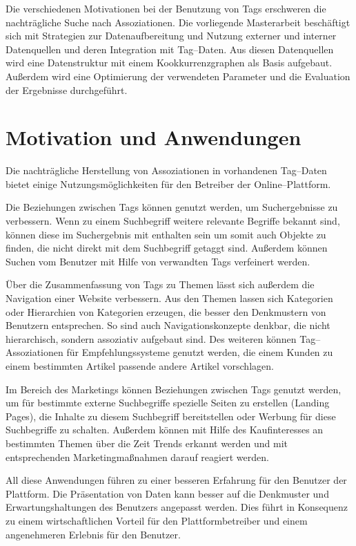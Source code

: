Die verschiedenen Motivationen bei der Benutzung von Tags erschweren die nachträgliche Suche nach Assoziationen. Die vorliegende Masterarbeit beschäftigt sich mit Strategien zur Datenaufbereitung und Nutzung externer und interner Datenquellen und deren Integration mit Tag--Daten. Aus diesen Datenquellen wird eine Datenstruktur mit einem Kookkurrenzgraphen als Basis aufgebaut. Außerdem wird eine Optimierung der verwendeten Parameter und die Evaluation der Ergebnisse durchgeführt.

\section{Motivation und Anwendungen}

Die nachträgliche Herstellung von Assoziationen in vorhandenen Tag--Daten bietet einige Nutzungsmöglichkeiten für den Betreiber der Online--Plattform.

Die Beziehungen zwischen Tags können genutzt werden, um Suchergebnisse zu verbessern. Wenn zu einem Suchbegriff weitere relevante Begriffe bekannt sind, können diese im Suchergebnis mit enthalten sein um somit auch Objekte zu finden, die nicht direkt mit dem Suchbegriff getaggt sind. Außerdem können Suchen vom Benutzer mit Hilfe von verwandten Tags verfeinert werden.

Über die Zusammenfassung von Tags zu Themen lässt sich außerdem die Navigation einer Website verbessern. Aus den Themen lassen sich Kategorien oder Hierarchien von Kategorien erzeugen, die besser den Denkmustern von Benutzern entsprechen. So sind auch Navigationskonzepte denkbar, die nicht hierarchisch, sondern assoziativ aufgebaut sind. Des weiteren können Tag--Assoziationen für Empfehlungssysteme genutzt werden, die einem Kunden zu einem bestimmten Artikel passende andere Artikel vorschlagen.

Im Bereich des Marketings können Beziehungen zwischen Tags genutzt werden, um für bestimmte externe Suchbegriffe spezielle Seiten zu erstellen (Landing Pages), die Inhalte zu diesem Suchbegriff bereitstellen oder Werbung für diese Suchbegriffe zu schalten. Außerdem können mit Hilfe des Kaufinteresses an bestimmten Themen über die Zeit Trends erkannt werden und mit entsprechenden Marketingmaßnahmen darauf reagiert werden.

All diese Anwendungen führen zu einer besseren Erfahrung für den Benutzer der Plattform. Die Präsentation von Daten kann besser auf die Denkmuster und Erwartungshaltungen des Benutzers angepasst werden. Dies führt in Konsequenz zu einem wirtschaftlichen Vorteil für den Plattformbetreiber und einem angenehmeren Erlebnis für den Benutzer.

